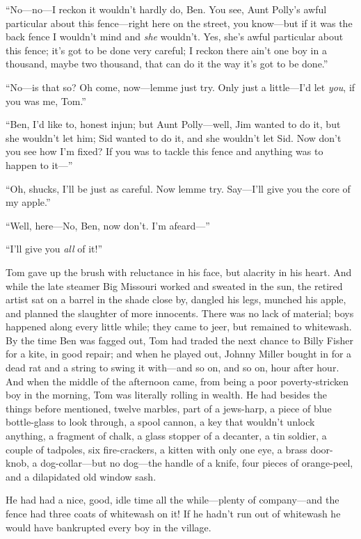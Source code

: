 \documentclass{book}
\begin{document}
“No—no—I reckon it wouldn’t hardly do, Ben. You see, Aunt Polly’s awful particular about this fence—right here on the street, you know—but if it was the back fence I wouldn’t mind and \emph{she} wouldn’t. Yes, she’s awful particular about this fence; it’s got to be done very careful; I reckon there ain’t one boy in a thousand, maybe two thousand, that can do it the way it’s got to be done.”

“No—is that so? Oh come, now—lemme just try. Only just a little—I’d let \emph{you}, if you was me, Tom.”

“Ben, I’d like to, honest injun; but Aunt Polly—well, Jim wanted to do it, but she wouldn’t let him; Sid wanted to do it, and she wouldn’t let Sid. Now don’t you see how I’m fixed? If you was to tackle this fence and anything was to happen to it—”

“Oh, shucks, I’ll be just as careful. Now lemme try. Say—I’ll give you the core of my apple.”

“Well, here—No, Ben, now don’t. I’m afeard—”

“I’ll give you \emph{all} of it!”

Tom gave up the brush with reluctance in his face, but alacrity in his heart. And while the late steamer Big Missouri worked and sweated in the sun, the retired artist sat on a barrel in the shade close by, dangled his legs, munched his apple, and planned the slaughter of more innocents. There was no lack of material; boys happened along every little while; they came to jeer, but remained to whitewash. By the time Ben was fagged out, Tom had traded the next chance to Billy Fisher for a kite, in good repair; and when he played out, Johnny Miller bought in for a dead rat and a string to swing it with—and so on, and so on, hour after hour. And when the middle of the afternoon came, from being a poor poverty-stricken boy in the morning, Tom was literally rolling in wealth. He had besides the things before mentioned, twelve marbles, part of a jews-harp, a piece of blue bottle-glass to look through, a spool cannon, a key that wouldn’t unlock anything, a fragment of chalk, a glass stopper of a decanter, a tin soldier, a couple of tadpoles, six fire-crackers, a kitten with only one eye, a brass door-knob, a dog-collar—but no dog—the handle of a knife, four pieces of orange-peel, and a dilapidated old window sash.

He had had a nice, good, idle time all the while—plenty of company—and the fence had three coats of whitewash on it! If he hadn’t run out of whitewash he would have bankrupted every boy in the village.
\end{document}
